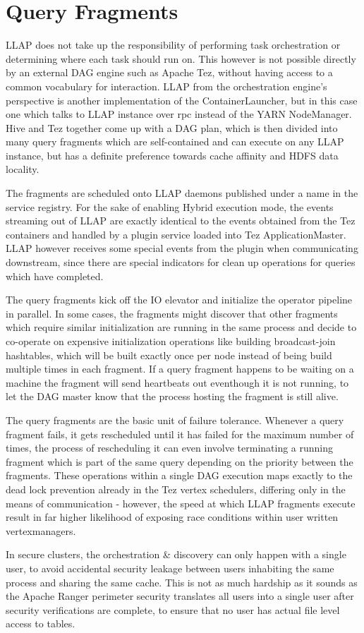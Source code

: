 \section{Query Fragments}

LLAP does not take up the responsibility of performing task orchestration or determining where each task should run on. 
This however is not possible directly by an external DAG engine such as Apache Tez\cite{tez}, without having access to
a common vocabulary for interaction. LLAP from the orchestration engine's perspective is another implementation of the
ContainerLauncher, but in this case one which talks to LLAP instance over rpc instead of the YARN NodeManager. Hive and
Tez together come up with a DAG plan, which is then divided into many query fragments which are self-contained and can 
execute on any LLAP instance, but has a definite preference towards cache affinity and HDFS data locality.

The fragments are scheduled onto LLAP daemons published under a name in the service registry. For the sake of enabling 
Hybrid execution mode, the events streaming out of LLAP are exactly identical to the events obtained from the Tez containers
and handled by a plugin service loaded into Tez ApplicationMaster. LLAP however receives some special events from the
plugin when communicating downstream, since there are special indicators for clean up operations for queries which have
completed.

The query fragments kick off the IO elevator and initialize the operator pipeline in parallel. In some cases, the fragments
might discover that other fragments which require similar initialization are running in the same process and decide to 
co-operate on expensive initialization operations like building broadcast-join hashtables, which will be built exactly once
per node instead of being build multiple times in each fragment. If a query fragment happens to be waiting on a machine the
fragment will send heartbeats out eventhough it is not running, to let the DAG master know that the process hosting the
fragment is still alive.

The query fragments are the basic unit of failure tolerance. Whenever a query fragment fails, it gets rescheduled until it
has failed for the maximum number of times, the process of rescheduling it can even involve terminating a running fragment
which is part of the same query depending on the priority between the fragments. These operations within a single DAG execution
maps exactly to the dead lock prevention already in the Tez vertex schedulers, differing only in the means of communication -
however, the speed at which LLAP fragments execute result in far higher likelihood of exposing race conditions within user
written vertexmanagers.


In secure clusters, the orchestration \& discovery can only happen with a single user, to avoid accidental security leakage
between users inhabiting the same process and sharing the same cache. This is not as much hardship as it sounds as the 
Apache Ranger\cite{ranger} perimeter security translates all users into a single user after security verifications are 
complete, to ensure that no user has actual file level access to tables.
